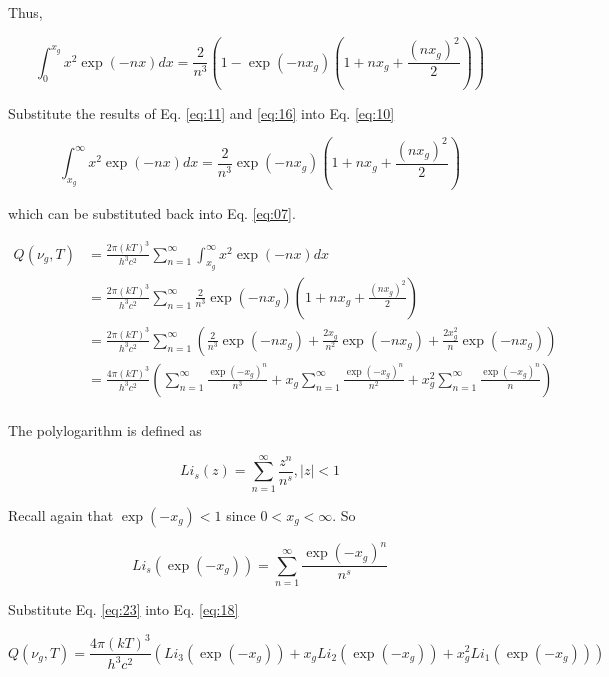 \documentclass[letterpaper,12pt]{article}
\begin{document}
Thus,

\begin{equation} \label{eq:16}
\int_{0}^{x_{g}} x^{2} \exp(-nx) dx = \frac{2}{n^{3}} \left( 1 - \exp(-nx_{g}) \left(1 + nx_{g} + \frac{ (nx_{g})^{2} }{2} \right) \right)
\end{equation}

Substitute the results of Eq. \ref{eq:11} and \ref{eq:16} into Eq. \ref{eq:10}

\begin{equation} \label{eq:17}
\int_{x_{g}}^{\infty} x^{2} \exp(-nx) dx = \frac{2}{n^{3}} \exp(-nx_{g}) \left( 1 + nx_{g} + \frac{ (nx_{g})^{2} }{2} \right)
\end{equation}

\noindent which can be substituted back into Eq. \ref{eq:07}.

\begin{align} \label{eq:18}
Q(\nu_{g}, T) &= \frac{2\pi (kT)^{3}}{h^{3} c^{2}} \sum_{n = 1}^{\infty} \int_{x_{g}}^{\infty} x^{2} \exp(-nx) dx \\
 &= \frac{2\pi (kT)^{3}}{h^{3} c^{2}} \sum_{n = 1}^{\infty} \frac{2}{n^{3}} \exp(-nx_{g}) \left( 1 + nx_{g} + \frac{ (nx_{g})^{2} }{2} \right) \\
 &= \frac{2\pi (kT)^{3}}{h^{3} c^{2}} \sum_{n = 1}^{\infty} \left( \frac{2}{n^{3}} \exp(-nx_{g}) + \frac{2x_{g}}{n^{2}} \exp(-nx_{g}) + \frac{2x_{g}^{2}}{n} \exp(-nx_{g}) \right) \\
 &= \frac{4\pi (kT)^{3}}{h^{3} c^{2}} \left(\sum_{n = 1}^{\infty} \frac{\exp(-x_{g})^{n}}{n^{3}} + x_{g} \sum_{n = 1}^{\infty} \frac{\exp(-x_{g})^{n}}{n^{2}} + x_{g}^{2} \sum_{n = 1}^{\infty} \frac{\exp(-x_{g})^{n}}{n} \right) \\
\end{align}

The polylogarithm is defined as

\begin{equation} \label{eq:22}
Li_{s}(z) = \sum_{n = 1}^{\infty} \frac{z^{n}}{n^{s}}, |z| < 1
\end{equation}

Recall again that $\exp(-x_{g}) < 1$ since $0 < x_{g} < \infty$. So

\begin{equation} \label{eq:23}
Li_{s} \left(\exp(-x_{g}) \right) = \sum_{n = 1}^{\infty} \frac{\exp(-x_{g})^{n}}{n^{s}}
\end{equation}

Substitute Eq. \ref{eq:23} into Eq. \ref{eq:18}

\begin{equation} \label{eq:24}
Q(\nu_{g}, T) = \frac{4\pi (kT)^{3}}{h^{3} c^{2}} \left(Li_{3}(\exp(-x_{g})) + x_{g} Li_{2}(\exp(-x_{g})) + x_{g}^{2} Li_{1}(\exp(-x_{g})) \right) 
\end{equation}


% 
% 
\end{document}
